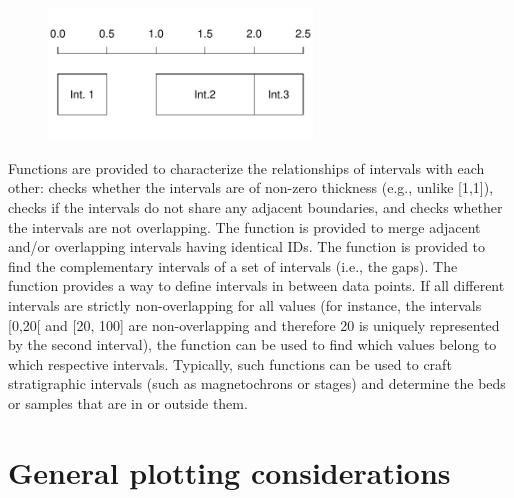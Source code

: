 
\begin{figure}[H]
	\centering
	\includegraphics[width=70mm]{int1}
\end{figure}
	
Functions are provided to characterize the relationships of intervals with each other:  checks whether the intervals are of non-zero thickness (e.g., unlike [1,1]),  checks if the intervals do not share any adjacent boundaries, and  checks whether the intervals are not overlapping. The  function is provided to merge adjacent and/or overlapping intervals having identical IDs. The  function is provided to find the complementary intervals of a set of intervals (i.e., the gaps). The  function provides a way to define intervals in between data points. If all different intervals are strictly non-overlapping for all values (for instance, the intervals [0,20[ and [20, 100] are non-overlapping and therefore 20 is uniquely represented by the second interval), the  function can be used to find which values belong to which respective intervals. Typically, such functions can be used to craft stratigraphic intervals (such as magnetochrons or stages) and determine the beds or samples that are in or outside them.

\section{General plotting considerations}

